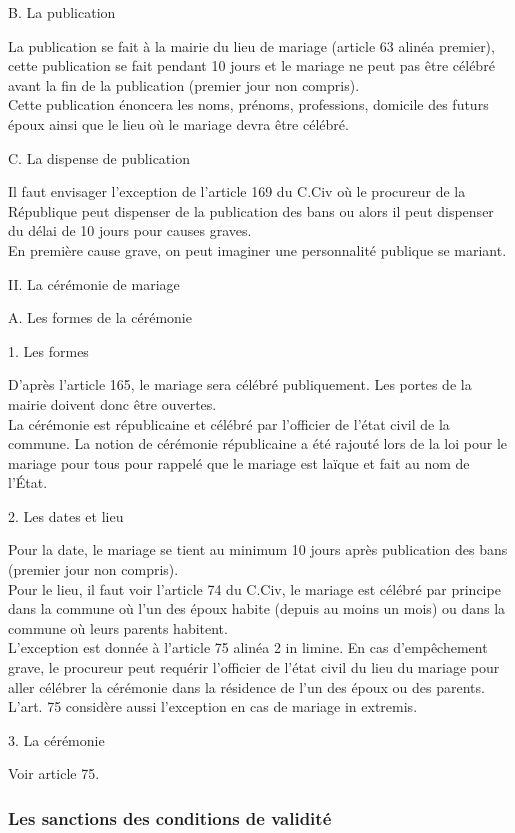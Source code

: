 \documentclass[12pt, a4paper, openany]{book}
\begin{document}
B. La publication


La publication se fait à la mairie du lieu de mariage (article 63 alinéa premier), cette publication se fait pendant 10 jours et le mariage ne peut pas être célébré avant la fin de la publication (premier jour non compris). \\
Cette publication énoncera les noms, prénoms, professions, domicile des futurs époux ainsi que le lieu où le mariage devra être célébré. 


C. La dispense de publication


Il faut envisager l'exception de l'article 169 du C.Civ où le procureur de la République peut dispenser de la publication des bans ou alors il peut dispenser du délai de 10 jours pour causes graves. \\
En première cause grave, on peut imaginer une personnalité publique se mariant. 


II. La cérémonie de mariage


A. Les formes de la cérémonie


1. Les formes


D'après l'article 165, le mariage sera célébré publiquement. Les portes de la mairie doivent donc être ouvertes. \\
La cérémonie est républicaine et célébré par l'officier de l'état civil de la commune. La notion de cérémonie républicaine a été rajouté lors de la loi pour le mariage pour tous pour rappelé que le mariage est laïque et fait au nom de l'État. 


2. Les dates et lieu


Pour la date, le mariage se tient au minimum 10 jours après publication des bans (premier jour non compris). \\
Pour le lieu, il faut voir l'article 74 du C.Civ, le mariage est célébré par principe dans la commune où l'un des époux habite (depuis au moins un mois) ou dans la commune où leurs parents habitent. \\
L'exception est donnée à l'article 75 alinéa 2 in limine. En cas d'empêchement grave, le procureur peut requérir l'officier de l'état civil du lieu du mariage pour aller célébrer la cérémonie dans la résidence de l'un des époux ou des parents. L'art. 75 considère aussi l'exception en cas de mariage in extremis. 


3. La cérémonie


Voir article 75. 




\subsubsection{Les sanctions des conditions de validité}
\end{document}
